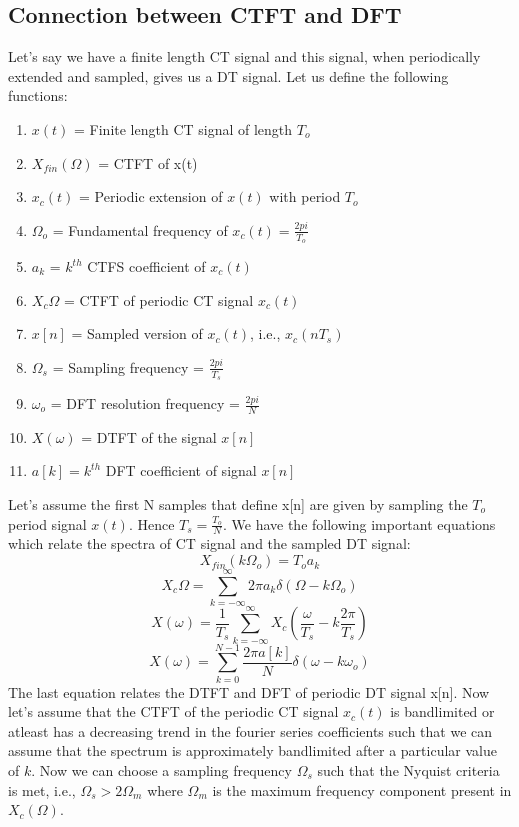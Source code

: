 \documentclass[12pt, a4paper]{article}
\begin{document}
\subsection{Connection between CTFT and DFT}
Let's say we have a finite length CT signal and this signal, when periodically extended and sampled, gives us a DT signal. Let us define the following functions:
\begin{enumerate}
    \item $x(t)$ = Finite length CT signal of length $T_{o}$
    \item $X_{fin}(\Omega)$ = CTFT of x(t)
    \item $x_{c}(t)$ = Periodic extension of $x(t)$ with period $T_{o}$
    \item $\Omega_{o}$ = Fundamental frequency of $x_{c}(t) = \frac{2pi}{T_{o}}$
    \item $a_{k}$ = $k^{th}$ CTFS coefficient of $x_c(t)$
    \item $X_c{\Omega}$ = CTFT of periodic CT signal $x_c(t)$
    \item $x[n]$ = Sampled version of $x_{c}(t)$, i.e., $x_{c}(nT_{s})$
    \item $\Omega_{s}$ = Sampling frequency = $\frac{2pi}{T_{s}}$
    \item $\omega_{o}$ = DFT resolution frequency = $\frac{2pi}{N}$
    \item $X(\omega)$ = DTFT of the signal $x[n]$
    \item $a[k] = k^{th}$ DFT coefficient of signal $x[n]$ 
\end{enumerate}
Let's assume the first N samples that define x[n] are given by sampling the $T_{o}$ period signal $x(t)$. Hence $T_{s} = \frac{T_{o}}{N}$. We have the following important equations which relate the spectra of CT signal and the sampled DT signal:
\begin{equation}
    X_{fin}(k\Omega_{o}) = T_{o} a_{k}
\end{equation}
\begin{equation}
    X_{c}{\Omega} = \sum_{k=-\infty}^{\infty}2\pi a_{k}\delta(\Omega-k\Omega_{o})
\end{equation}
\begin{equation}
    X(\omega) = \frac{1}{T_{s}} \sum_{k=-\infty}^{\infty}X_{c}(\frac{\omega}{T_{s}}-k\frac{2\pi}{T_{s}})
\end{equation}
\begin{equation}
    X(\omega) = \sum_{k=0}^{N-1} \frac{2\pi a[k]}{N}\delta (\omega -k\omega _{o})
\end{equation}
The last equation relates the DTFT and DFT of periodic DT signal x[n]. Now let's assume that the CTFT of the periodic CT signal $x_{c}(t)$ is bandlimited or atleast has a decreasing trend in the fourier series coefficients such that we can assume that the spectrum is approximately bandlimited after a particular value of $k$.
Now we can choose a sampling frequency $\Omega _{s}$ such that the Nyquist criteria is met, i.e., $\Omega _{s} > 2\Omega _{m}$ where $\Omega _{m}$ is the maximum frequency component present in $X_{c}(\Omega)$.
\end{document}
